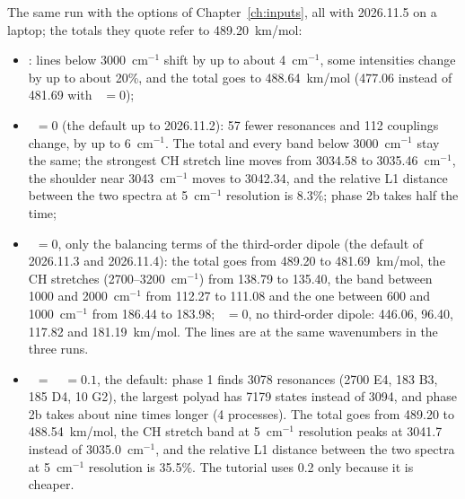 The same run with the options of Chapter~\ref{ch:inputs}, all with
2026.11.5 on a laptop; the totals they quote refer to 489.20~km/mol:
\begin{itemize}
\item {}: lines below 3000~cm$^{-1}$ shift by up to about
  4~cm$^{-1}$, some intensities change by up to about 20\%, and the total
  goes to 488.64~km/mol (477.06 instead of 481.69 with
  ~$=0$);
\item {}~$=0$ (the default up to 2026.11.2): 57 fewer
  resonances and 112 couplings change, by up to 6~cm$^{-1}$. The total
  and every band below 3000~cm$^{-1}$ stay the same; the strongest CH
  stretch line moves from 3034.58 to 3035.46~cm$^{-1}$, the shoulder near
  3043~cm$^{-1}$ moves to 3042.34, and the relative L1 distance between
  the two spectra at 5~cm$^{-1}$ resolution is 8.3\%; phase 2b takes half
  the time;
\item {}~$=0$, only the balancing terms of the third-order
  dipole (the default of 2026.11.3 and 2026.11.4): the total goes from
  489.20 to 481.69~km/mol, the CH stretches (2700--3200~cm$^{-1}$) from
  138.79 to 135.40, the band between 1000 and 2000~cm$^{-1}$ from 112.27
  to 111.08 and the one between 600 and 1000~cm$^{-1}$ from 186.44 to
  183.98; ~$=0$, no third-order dipole: 446.06,
  96.40, 117.82 and 181.19~km/mol. The lines are at the same wavenumbers
  in the three runs.
\item {}~$=$~~$=0.1$, the default: phase 1
  finds 3078 resonances (2700 E4, 183 B3, 185 D4, 10 G2), the largest
  polyad has 7179 states instead of 3094, and phase 2b takes about nine
  times longer (4 processes). The total goes from 489.20 to
  488.54~km/mol, the CH stretch band at 5~cm$^{-1}$ resolution peaks at
  3041.7 instead of 3035.0~cm$^{-1}$, and the relative L1 distance between
  the two spectra at 5~cm$^{-1}$ resolution is 35.5\%. The tutorial uses 0.2 only because it is cheaper.
\end{itemize}
